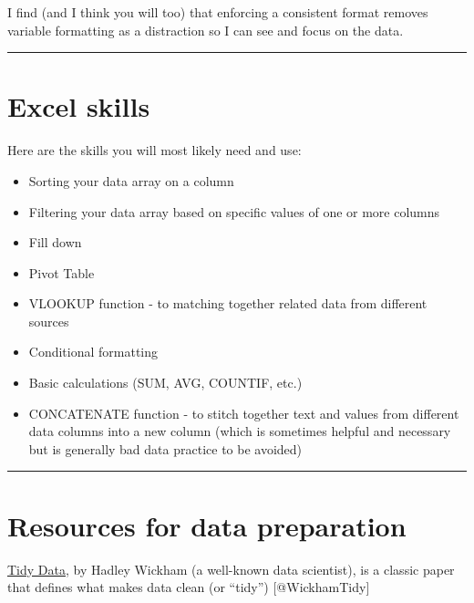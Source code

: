 \documentclass[
  letterpaper,
  DIV=11,
  numbers=noendperiod]{scrreprt}
\providecommand{\tightlist}{%
  \setlength{\itemsep}{0pt}\setlength{\parskip}{0pt}}\usepackage{longtable,booktabs,array}
\begin{document}
I find (and I think you will too) that enforcing a consistent format
removes variable formatting as a distraction so I can see and focus on
the data.

\begin{center}\rule{0.5\linewidth}{0.5pt}\end{center}

\hypertarget{excel-skills}{%
\section*{Excel skills}\label{excel-skills}}

Here are the skills you will most likely need and use:

\begin{itemize}
\tightlist
\item
  Sorting your data array on a column
\item
  Filtering your data array based on specific values of one or more
  columns
\item
  Fill down
\item
  Pivot Table
\item
  VLOOKUP function - to matching together related data from different
  sources
\item
  Conditional formatting
\item
  Basic calculations (SUM, AVG, COUNTIF, etc.)
\item
  CONCATENATE function - to stitch together text and values from
  different data columns into a new column (which is sometimes helpful
  and necessary but is generally bad data practice to be avoided)
\end{itemize}

\begin{center}\rule{0.5\linewidth}{0.5pt}\end{center}

\hypertarget{resources-for-data-preparation}{%
\section*{Resources for data
preparation}\label{resources-for-data-preparation}}

\href{https://vita.had.co.nz/papers/tidy-data.pdf}{Tidy Data}, by Hadley
Wickham (a well-known data scientist), is a classic paper that defines
what makes data clean (or ``tidy'') {[}@WickhamTidy{]}
\end{document}
